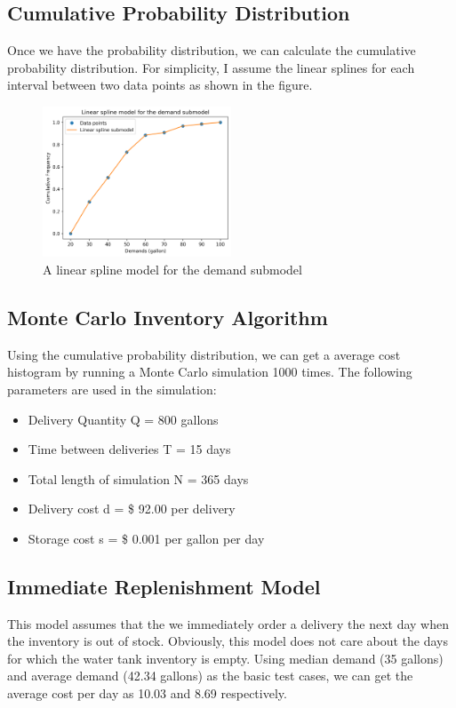 \documentclass[11pt]{article}
\begin{document}
\subsection{Cumulative Probability Distribution}
Once we have the probability distribution, we can calculate the cumulative probability distribution. For simplicity, I assume the linear splines for each interval between two data points as shown in the figure.

\begin{figure}[H]
    \centering
    \includegraphics[width=0.5\textwidth]{interpolation}
    \caption{A linear spline model for the demand submodel}
    \label{fit}
\end{figure}

\subsection{Monte Carlo Inventory Algorithm}

Using the cumulative probability distribution, we can get a average cost histogram by running a Monte Carlo simulation 1000 times. The following parameters are used in the simulation:
\begin{itemize}
    \item Delivery Quantity Q = 800 gallons
    \item Time between deliveries T = 15 days
    \item Total length of simulation N = 365 days
    \item Delivery cost d = \$ 92.00 per delivery
    \item Storage cost s = \$ 0.001 per gallon per day
\end{itemize}

\subsection{Immediate Replenishment Model}
This model assumes that the we immediately order a delivery the next day when the inventory is out of stock. Obviously, this model does not care about the days for which the water tank inventory is empty.
Using median demand (35 gallons) and average demand (42.34 gallons) as the basic test cases, we can get the average cost per day as 10.03 and 8.69 respectively.
\end{document}
